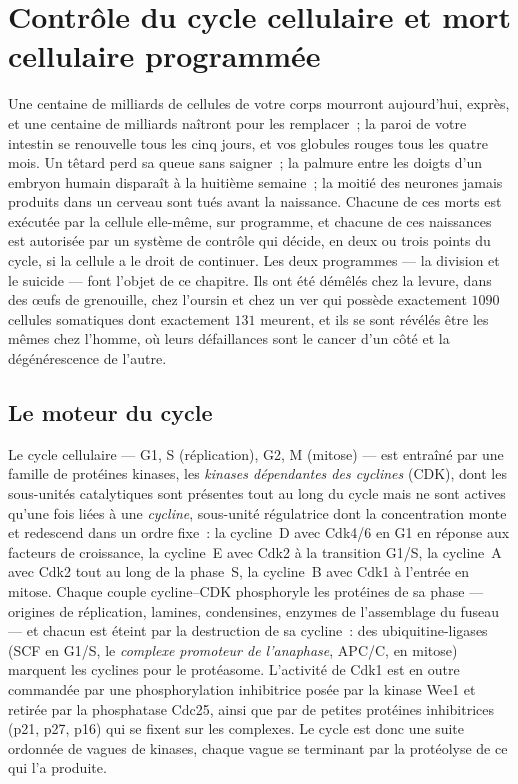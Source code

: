 \chapter{Contrôle du cycle cellulaire et mort cellulaire programmée}\label{ch:b3:cell-cycle-apoptosis}

Une centaine de milliards de cellules de votre corps mourront
aujourd'hui, exprès, et une centaine de milliards naîtront pour les
remplacer~; la paroi de votre intestin se renouvelle tous les cinq
jours, et vos globules rouges tous les quatre mois. Un têtard perd sa
queue sans saigner~; la palmure entre les doigts d'un embryon humain
disparaît à la huitième semaine~; la moitié des neurones jamais
produits dans un cerveau sont tués avant la naissance. Chacune de ces
morts est exécutée par la cellule elle-même, sur programme, et chacune
de ces naissances est autorisée par un système de contrôle qui décide,
en deux ou trois points du cycle, si la cellule a le droit de
continuer. Les deux programmes --- la division et le suicide --- font
l'objet de ce chapitre. Ils ont été démêlés chez la levure, dans des
œufs de grenouille, chez l'oursin et chez un ver qui possède exactement
$1090$ cellules somatiques dont exactement $131$ meurent, et ils se
sont révélés être les mêmes chez l'homme, où leurs défaillances sont le
cancer d'un côté et la dégénérescence de l'autre.

\section{Le moteur du cycle}

\begin{definition}\label{def:b3:cell-cycle-apoptosis:cdk}
Le cycle cellulaire --- G1, S (réplication), G2, M (mitose) --- est
entraîné par une famille de protéines kinases, les \emph{kinases
dépendantes des cyclines} (CDK), dont les sous-unités catalytiques sont
présentes tout au long du cycle mais ne sont actives qu'une fois liées
à une \emph{cycline}, sous-unité régulatrice dont la concentration monte
et redescend dans un ordre fixe~: la cycline~D avec Cdk4/6 en G1 en
réponse aux facteurs de croissance, la cycline~E avec Cdk2 à la
transition G1/S, la cycline~A avec Cdk2 tout au long de la phase~S, la
cycline~B avec Cdk1 à l'entrée en mitose. Chaque couple cycline--CDK
phosphoryle les protéines de sa phase --- origines de réplication,
lamines, condensines, enzymes de l'assemblage du fuseau --- et chacun
est éteint par la destruction de sa cycline~: des ubiquitine-ligases
(SCF en G1/S, le \emph{complexe promoteur de l'anaphase}, APC/C, en
mitose) marquent les cyclines pour le protéasome. L'activité de Cdk1
est en outre commandée par une phosphorylation inhibitrice posée par la
kinase Wee1 et retirée par la phosphatase Cdc25, ainsi que par de
petites protéines inhibitrices (p21, p27, p16) qui se fixent sur les
complexes. Le cycle est donc une suite ordonnée de vagues de kinases,
chaque vague se terminant par la protéolyse de ce qui l'a produite.
\end{definition}

